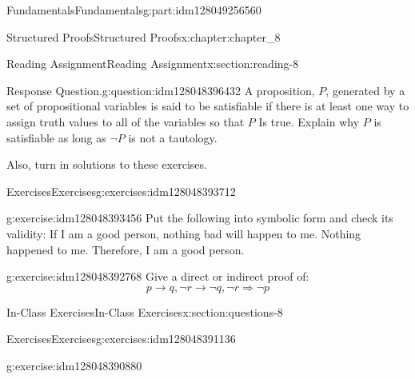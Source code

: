 \documentclass[oneside,10pt,]{book}
\numberwithin{equation}{section}
\begin{document}
\begin{partptx}{Fundamentals}{}{Fundamentals}{}{}{g:part:idm128049256560}
\begin{chapterptx}{Structured Proofs}{}{Structured Proofs}{}{}{x:chapter:chapter_8}
\begin{sectionptx}{Reading Assignment}{}{Reading Assignment}{}{}{x:section:reading-8}
\begin{question}{Response Question.}{g:question:idm128048396432}%
A proposition, \(P\), generated by a set of propositional variables is said to be satisfiable if there is at least one way to assign truth values to all of the variables so that \(P\) Is true. Explain why \(P\) is satisfiable as long as \(\neg P\)  is not a tautology.%
\end{question}
Also, turn in solutions to these exercises.%
%
%
\typeout{************************************************}
\typeout{************************************************}
%
\begin{exercises-subsection}{Exercises}{}{Exercises}{}{}{g:exercises:idm128048393712}
\par\medskip\noindent%
%
\begin{exercisegroup}
\begin{divisionexerciseeg}{1}{}{}{g:exercise:idm128048393456}%
Put the following into symbolic form and check its validity: If I am a good person, nothing bad will happen to me. Nothing happened to me. Therefore, I am a good person.%
\end{divisionexerciseeg}%
\begin{divisionexerciseeg}{2}{}{}{g:exercise:idm128048392768}%
Give  a direct or indirect proof of:%
\begin{equation*}
p\rightarrow  q, \neg r\rightarrow  \neg q, \neg r \Rightarrow  \neg p
\end{equation*}
%
\end{divisionexerciseeg}%
\end{exercisegroup}
\par\medskip\noindent
\end{exercises-subsection}
\end{sectionptx}
%
%
\typeout{************************************************}
\typeout{************************************************}
%
\begin{sectionptx}{In-Class Exercises}{}{In-Class Exercises}{}{}{x:section:questions-8}
%
%
%
\typeout{************************************************}
\typeout{************************************************}
%
\begin{exercises-subsection}{Exercises}{}{Exercises}{}{}{g:exercises:idm128048391136}
\par\medskip\noindent%
%
\begin{exercisegroup}
\begin{divisionexerciseeg}{1}{}{}{g:exercise:idm128048390880}%

\end{divisionexerciseeg}
\end{exercisegroup}
\end{exercises-subsection}
\end{sectionptx}
\end{chapterptx}
\end{partptx}
\end{document}
